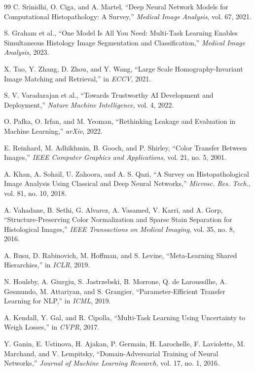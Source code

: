 \documentclass[conference,a4paper]{IEEEtran}
\begin{document}
\begin{thebibliography}{99}
C. Srinidhi, O. Ciga, and A. Martel, ``Deep Neural Network Models for Computational Histopathology: A Survey,'' \emph{Medical Image Analysis}, vol. 67, 2021.

S. Graham et al., ``One Model Is All You Need: Multi-Task Learning Enables Simultaneous Histology Image Segmentation and Classification,'' \emph{Medical Image Analysis}, 2023.

X. Tao, Y. Zhang, D. Zhou, and Y. Wang, ``Large Scale Homography-Invariant Image Matching and Retrieval,'' in \emph{ECCV}, 2021.

S. V. Varadarajan et al., ``Towards Trustworthy AI Development and Deployment,'' \emph{Nature Machine Intelligence}, vol. 4, 2022.

O. Pafka, O. Irfan, and M. Yeoman, ``Rethinking Leakage and Evaluation in Machine Learning,'' \emph{arXiv}, 2022.

E. Reinhard, M. Adhikhmin, B. Gooch, and P. Shirley, ``Color Transfer Between Images,'' \emph{IEEE Computer Graphics and Applications}, vol. 21, no. 5, 2001.

A. Khan, A. Sohail, U. Zahoora, and A. S. Qazi, ``A Survey on Histopathological Image Analysis Using Classical and Deep Neural Networks,'' \emph{Microsc. Res. Tech.}, vol. 81, no. 10, 2018.

A. Vahadane, B. Sethi, G. Alvarez, A. Vasamed, V. Karri, and A. Gorp, ``Structure-Preserving Color Normalization and Sparse Stain Separation for Histological Images,'' \emph{IEEE Transactions on Medical Imaging}, vol. 35, no. 8, 2016.

A. Rusu, D. Rabinovich, M. Hoffman, and S. Levine, ``Meta-Learning Shared Hierarchies,'' in \emph{ICLR}, 2019.

N. Houlsby, A. Giurgiu, S. Jastrzebski, B. Morrone, Q. de Laroussilhe, A. Gesmundo, M. Attariyan, and S. Grangier, ``Parameter-Efficient Transfer Learning for NLP,'' in \emph{ICML}, 2019.

A. Kendall, Y. Gal, and R. Cipolla, ``Multi-Task Learning Using Uncertainty to Weigh Losses,'' in \emph{CVPR}, 2017.

Y. Ganin, E. Ustinova, H. Ajakan, P. Germain, H. Larochelle, F. Laviolette, M. Marchand, and V. Lempitsky, ``Domain-Adversarial Training of Neural Networks,'' \emph{Journal of Machine Learning Research}, vol. 17, no. 1, 2016.


\end{thebibliography}
\end{document}
